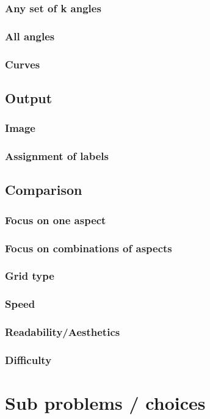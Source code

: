 \documentclass[a4paper]{article}
\begin{document}
\subsubsection{Any set of k angles}
\subsubsection{All angles}
\subsubsection{Curves}
\subsection{Output}
\subsubsection{Image}
\subsubsection{Assignment of labels}
\subsection{Comparison}
\subsubsection{Focus on one aspect}
\subsubsection{Focus on combinations of aspects}
\subsubsection{Grid type}
\subsubsection{Speed}
\subsubsection{Readability/Aesthetics}
\subsubsection{Difficulty}
\newpage
\section{Sub problems / choices}
\end{document}
